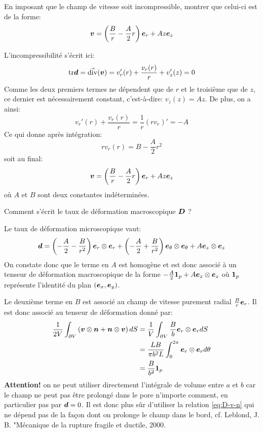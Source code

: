 \documentclass[french,12pt]{exam}
\begin{document}
\begin{questions}
\question En imposant que le champ de vitesse soit incompressible, montrer que celui-ci est de la forme:\\
\begin{equation}
  \boldsymbol{v} = \left( \frac{B}{r} -  \frac{A}{2}r \right)  \boldsymbol{e}_r +  A z \boldsymbol{e}_z 
\end{equation}
\begin{solution}
L'incompressibilité s'écrit ici:
$$\mathrm{tr}\boldsymbol{d} = \vec{\mathrm{div}}{\left(\boldsymbol{v}\right)} = v_r'(r)+\dfrac{v_r(r)}{r}+v_z'(z)=0$$
Comme les deux premiers termes ne dépendent que de $r$ et le troisième que de $z$, ce dernier est nécessairement constant, c'est-à-dire: $v_z(z) = Az$. De plus, on a ainsi:
$$v_r'(r)+\dfrac{v_r(r)}{r}= \dfrac{1}{r}(rv_r)'=-A$$
Ce qui donne après intégration:
$$rv_r(r) = B -  \frac{A}{2}r^2$$
soit au final:
\begin{equation}
  \boldsymbol{v} = \left( \frac{B}{r} -  \frac{A}{2}r \right)  \boldsymbol{e}_r +  A z \boldsymbol{e}_z 
\end{equation}
où $A$ et $B$ sont deux constantes indéterminées.
\end{solution}

\question Comment s'écrit le taux de déformation macroscopique $\boldsymbol{D}$ ? \\
\begin{solution}
Le taux de déformation microscopique vaut:
$$\boldsymbol{d} = \left(-\frac{A}{2}-\frac{B}{r^2}\right)\boldsymbol{e}_r\otimes\boldsymbol{e}_r + \left(-\frac{A}{2}+\frac{B}{r^2}\right)\boldsymbol{e}_\theta\otimes\boldsymbol{e}_\theta + A\boldsymbol{e}_z\otimes\boldsymbol{e}_z$$
On constate donc que le terme en $A$ est homogène et est donc associé à un tenseur de déformation macroscopique de la forme $-\frac{A}{2}\boldsymbol{1}_p + A\boldsymbol{e}_z\otimes\boldsymbol{e}_z$ où $\boldsymbol{1}_p$ représente l'identité du plan $(\boldsymbol{e}_x,\boldsymbol{e}_y)$. 

Le deuxième terme en $B$ est associé au champ de vitesse purement radial $\frac{B}{r}\boldsymbol{e}_r$. Il est donc associé au tenseur de déformation donné par:
\begin{align*}
\frac{1}{2V} \int_{\partial V} \left(\boldsymbol{v} \otimes \boldsymbol{n} + \boldsymbol{n} \otimes \boldsymbol{v}     \right) dS &= \frac{1}{V}\int_{\partial V} \dfrac{B}{b} \boldsymbol{e}_r\otimes\boldsymbol{e}_r dS \\
&= \dfrac{L B}{\pi b^2 L} \int_0^{2\pi}\boldsymbol{e}_r\otimes\boldsymbol{e}_r d\theta\\
&= \dfrac{B}{b^2} \boldsymbol{1}_p
\end{align*}
\textbf{Attention!} on ne peut utiliser directement l'intégrale de volume entre $a$ et $b$ car le champ ne peut pas être prolongé dans le pore n'importe comment, en particulier pas par $\boldsymbol{d}=0$. Il est donc plus sûr d'utiliser la relation \eqref{eq:D-v-n} qui ne dépend pas de la façon dont on prolonge le champ dans le bord, cf. Leblond, J. B. "Mécanique de la rupture fragile et ductile, 2000.


\end{solution}
\end{questions}
\end{document}

